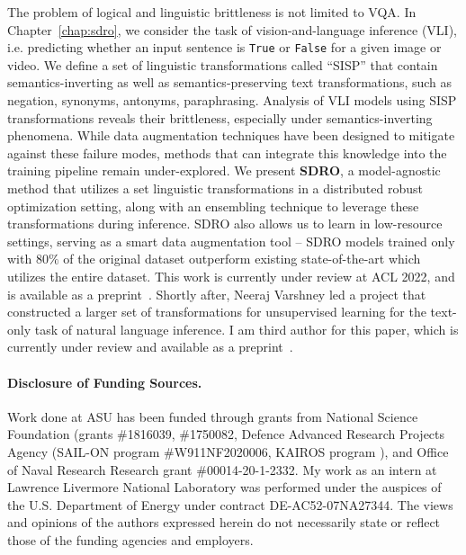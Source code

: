 The problem of logical and linguistic brittleness is not limited to VQA.
In Chapter~\ref{chap:sdro}, we consider the task of vision-and-language inference (VLI), i.e. predicting whether an input sentence is \texttt{True} or \texttt{False} for a given image or video.
We define a set of linguistic transformations called ``SISP'' that contain semantics-inverting as well as semantics-preserving text transformations, such as negation, synonyms, antonyms, paraphrasing.
Analysis of VLI models using SISP transformations reveals their brittleness, especially under semantics-inverting phenomena.
While data augmentation techniques have been designed to mitigate against these failure modes, methods that can integrate this knowledge into the training pipeline remain under-explored.
We present \textbf{SDRO},
a model-agnostic method that utilizes a set linguistic transformations in a distributed robust optimization setting, along with an ensembling technique to leverage these transformations during inference.
SDRO also allows us to learn in low-resource settings, serving as a smart data augmentation tool -- SDRO models trained only with $80\%$ of the original dataset outperform existing state-of-the-art which utilizes the entire dataset.
This work is currently under review at ACL 2022, and is available as a preprint~\citep{gokhale2021semantically}.
Shortly after, Neeraj Varshney led a project that constructed a larger set of transformations for unsupervised learning for the text-only task of natural language inference. I am third author for this paper, which is currently under review and available as a preprint~\citep{varshney2021unsupervised}.



\vspace*{\fill}
\paragraph{Disclosure of Funding Sources.}
Work done at ASU has been funded through grants from
National Science Foundation (grants \#1816039, \#1750082, 
Defence Advanced Research Projects Agency (SAIL-ON program \#W911NF2020006, KAIROS program ), 
and Office of Naval Research Research grant \#00014-20-1-2332.
My work as an intern at Lawrence Livermore National Laboratory was performed under the auspices of the U.S. Department of Energy under contract DE-AC52-07NA27344.
The views and opinions of the authors expressed herein do not necessarily state or reflect those of the funding agencies and employers.


